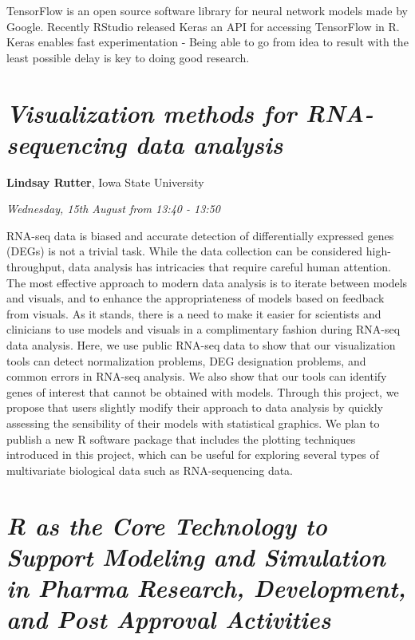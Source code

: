 \documentclass[]{book}
\theoremstyle{definition}
\theoremstyle{definition}
\theoremstyle{definition}
\theoremstyle{remark}
\begin{document}
TensorFlow is an open source software library for neural network models
made by Google. Recently RStudio released Keras an API for accessing
TensorFlow in R. Keras enables fast experimentation - Being able to go
from idea to result with the least possible delay is key to doing good
research.

\hypertarget{visualization-methods-for-rna-sequencing-data-analysis}{%
\section{\texorpdfstring{\emph{Visualization methods for RNA-sequencing
data
analysis}}{Visualization methods for RNA-sequencing data analysis}}\label{visualization-methods-for-rna-sequencing-data-analysis}}

\textbf{Lindsay Rutter}, Iowa State University

\emph{Wednesday, 15th August from 13:40 - 13:50}

RNA-seq data is biased and accurate detection of differentially
expressed genes (DEGs) is not a trivial task. While the data collection
can be considered high-throughput, data analysis has intricacies that
require careful human attention. The most effective approach to modern
data analysis is to iterate between models and visuals, and to enhance
the appropriateness of models based on feedback from visuals. As it
stands, there is a need to make it easier for scientists and clinicians
to use models and visuals in a complimentary fashion during RNA-seq data
analysis. Here, we use public RNA-seq data to show that our
visualization tools can detect normalization problems, DEG designation
problems, and common errors in RNA-seq analysis. We also show that our
tools can identify genes of interest that cannot be obtained with
models. Through this project, we propose that users slightly modify
their approach to data analysis by quickly assessing the sensibility of
their models with statistical graphics. We plan to publish a new R
software package that includes the plotting techniques introduced in
this project, which can be useful for exploring several types of
multivariate biological data such as RNA-sequencing data.

\hypertarget{r-as-the-core-technology-to-support-modeling-and-simulation-in-pharma-research-development-and-post-approval-activities}{%
\section{\texorpdfstring{\emph{R as the Core Technology to Support
Modeling and Simulation in Pharma Research, Development, and Post
Approval
Activities}}{R as the Core Technology to Support Modeling and Simulation in Pharma Research, Development, and Post Approval Activities}}\label{r-as-the-core-technology-to-support-modeling-and-simulation-in-pharma-research-development-and-post-approval-activities}}
\end{document}
